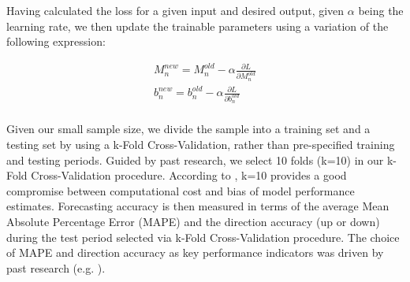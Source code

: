 Having calculated the loss for a given input and desired output, given $\alpha$ being the learning rate, we then update the trainable parameters using a variation of the following expression:

\begin{ceqn}
\begin{align}
M_n^{new} = M_n^{old} - \alpha\frac{\partial L}{\partial M_n^{old}} \\
b_n^{new} = b_n^{old} - \alpha\frac{\partial L}{\partial b_n^{old}} \\
\end{align}
\end{ceqn}

Given our small sample size, we divide the sample into a training set and a testing set by using a k-Fold Cross-Validation, rather than pre-specified training and testing periods. Guided by past research, we select 10 folds (k=10) in our k-Fold Cross-Validation procedure. According to \textcite{james2013introduction}, k=10 provides a good compromise between computational cost and bias of model performance estimates. Forecasting accuracy is then measured in terms of the average Mean Absolute Percentage Error (MAPE) and the direction accuracy (up or down) during the test period selected via k-Fold Cross-Validation procedure. The choice of MAPE and direction accuracy as key performance indicators was driven by past research (e.g. \textcite{bollen2011twitter}).
